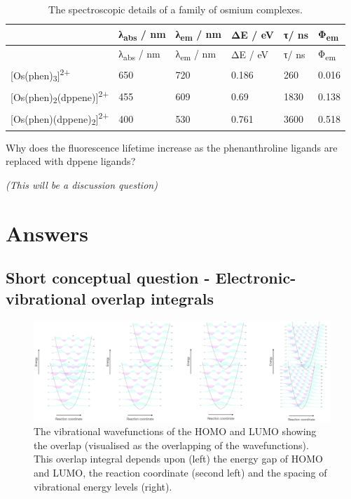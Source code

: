 \documentclass[
]{book}
\begin{document}
\begin{longtable}[]{@{}llllll@{}}
\caption{\label{tab:osphen} The spectroscopic details of a family of osmium complexes.}\tabularnewline
\toprule
& λ\textsubscript{abs} / nm & λ\textsubscript{em} / nm & ΔE / eV & τ/ ns & Φ\textsubscript{em} \\
\midrule
\endfirsthead
\toprule
& λ\textsubscript{abs} / nm & λ\textsubscript{em} / nm & ΔE / eV & τ/ ns & Φ\textsubscript{em} \\
\midrule
\endhead
{[}Os(phen)\textsubscript{3}{]}\textsuperscript{2+} & 650 & 720 & 0.186 & 260 & 0.016 \\
{[}Os(phen)\textsubscript{2}(dppene){]}\textsuperscript{2+} & 455 & 609 & 0.69 & 1830 & 0.138 \\
{[}Os(phen)(dppene)\textsubscript{2}{]}\textsuperscript{2+} & 400 & 530 & 0.761 & 3600 & 0.518 \\
\bottomrule
\end{longtable}

Why does the fluorescence lifetime increase as the phenanthroline ligands are replaced with dppene ligands?

\emph{(This will be a discussion question)}

\hypertarget{answers}{%
\section{Answers}\label{answers}}

\hypertarget{sec:overlapans}{%
\subsection{Short conceptual question - Electronic-vibrational overlap integrals}\label{sec:overlapans}}

\begin{figure}

{\centering \includegraphics[width=1\linewidth]{images/intconvoverlap2} 

}

\caption{The vibrational wavefunctions of the HOMO and LUMO showing the overlap (visualised as the overlapping of the wavefunctions). This overlap integral depends upon (left) the energy gap of HOMO and LUMO, the reaction coordinate (second left) and the spacing of vibrational energy levels (right).}\label{fig:overlapans}
\end{figure}
\end{document}
